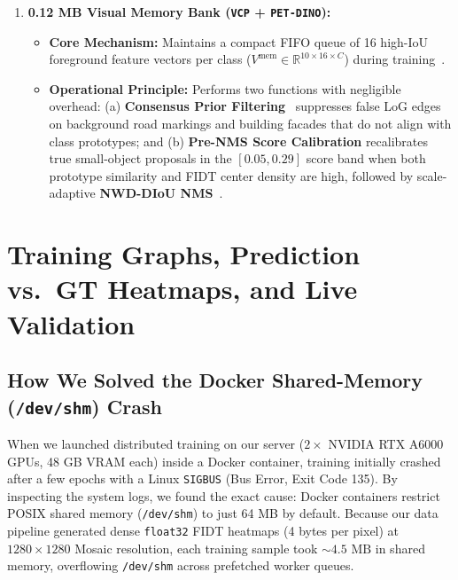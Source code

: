 \documentclass[11pt,a4paper]{article}
\begin{document}
\begin{enumerate}[leftmargin=1.6em]
    \item \textbf{0.12 MB Visual Memory Bank (\texttt{VCP} + \texttt{PET-DINO}):}
    \begin{itemize}[leftmargin=1.2em]
        \item \textbf{Core Mechanism:} Maintains a compact FIFO queue of 16 high-IoU foreground feature vectors per class ($V^{\text{mem}} \in \mathbb{R}^{10\times 16\times C}$) during training~\cite{fu2026petdino}.
        \item \textbf{Operational Principle:} Performs two functions with negligible overhead: (a) \textbf{Consensus Prior Filtering}~\cite{wang2025vcp} suppresses false LoG edges on background road markings and building facades that do not align with class prototypes; and (b) \textbf{Pre-NMS Score Calibration} recalibrates true small-object proposals in the $[0.05, 0.29]$ score band when both prototype similarity and FIDT center density are high, followed by scale-adaptive \textbf{NWD-DIoU NMS}~\cite{wang2021nwd,zheng2020diou}.
    \end{itemize}
\end{enumerate}

\section{Training Graphs, Prediction vs.\ GT Heatmaps, and Live Validation}

\subsection{How We Solved the Docker Shared-Memory (\texttt{/dev/shm}) Crash}
When we launched distributed training on our server ($2\times$ NVIDIA RTX A6000 GPUs, 48 GB VRAM each) inside a Docker container, training initially crashed after a few epochs with a Linux \texttt{SIGBUS} (Bus Error, Exit Code 135). By inspecting the system logs, we found the exact cause: Docker containers restrict POSIX shared memory (\texttt{/dev/shm}) to just 64 MB by default. Because our data pipeline generated dense \texttt{float32} FIDT heatmaps (4 bytes per pixel) at $1280\times 1280$ Mosaic resolution, each training sample took $\sim 4.5\text{ MB}$ in shared memory, overflowing \texttt{/dev/shm} across prefetched worker queues.
\end{document}
